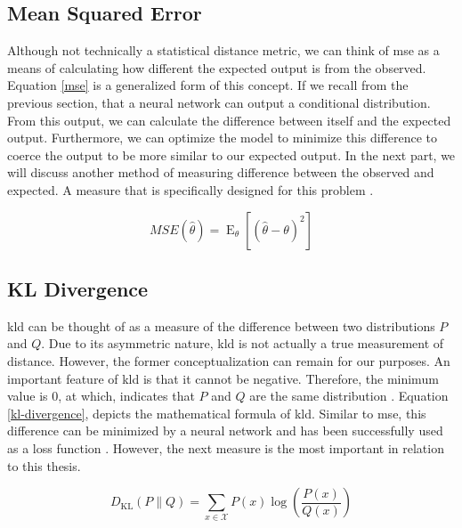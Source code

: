 \subsection{Mean Squared Error}
\hspace{0.5in}Although not technically a statistical distance metric, we can think of \acrfull{mse} as a means of calculating how different the expected output is from the observed. Equation \ref{mse} is a generalized form of this concept. If we recall from the previous section, that a neural network can output a conditional distribution. From this output, we can calculate the difference between itself and the expected output. Furthermore, we can optimize the model to minimize this difference to coerce the output to be more similar to our expected output. In the next part, we will discuss another method of measuring difference between the observed and expected. A measure that is specifically designed for this problem \cite{Goodfellow-et-al-2016}.
\begin{center}
    \begin{equation}
    \label{mse}
        {MSE} ({\hat {\theta }})=\operatorname {E} _{\theta }\left[({\hat {\theta }}-\theta )^{2}\right]
    \end{equation}
\end{center}

\subsection{KL Divergence}
\hspace{0.5in}\acrfull{kld}\cite{kullback1951} can be thought of as a measure of the difference between two distributions $P$ and $Q$. Due to its asymmetric nature, \acrshort{kld} is not actually a true measurement of distance. However, the former conceptualization can remain for our purposes. An important feature of \acrshort{kld} is that it cannot be negative. Therefore, the minimum value is 0, at which, indicates that $P$ and $Q$ are the same distribution . Equation \ref{kl-divergence}, depicts the mathematical formula of \acrshort{kld}. Similar to \acrshort{mse}, this difference can be minimized by a neural network and has been successfully used as a loss function \cite{Goodfellow-et-al-2016}. However, the next measure is the most important in relation to this thesis.

\begin{center}
    \begin{equation}
    \label{kl-divergence}
       D_{\text{KL}}(P\parallel Q)=\sum _{x\in {\mathcal {X}}}P(x)\log \left({\frac {P(x)}{Q(x)}}\right)
    \end{equation}
\end{center}

